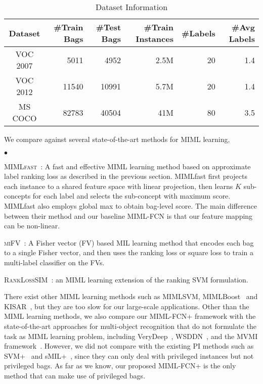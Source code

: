 \documentclass[10pt,twocolumn,letterpaper]{article}
\newcommand{\squishlist}{
	\begin{list}{$\bullet$}
		{ \setlength{\itemsep}{0pt}
			\setlength{\parsep}{1pt}
			\setlength{\topsep}{1pt}
			\setlength{\partopsep}{0pt}
			\setlength{\leftmargin}{1.5em}
			\setlength{\labelwidth}{1em}
			\setlength{\labelsep}{0.5em} } }
\newcommand{\squishend}{
	\end{list}  }
\begin{document}
\begin{table*}
	\centering
	\caption{Dataset Information} \label{datasets}
	\begin{tabular}{c | r r r r r }
		\hline
		Dataset &\#Train Bags &\#Test Bags &\#Train Instances &\#Labels &\#Avg Labels \\ \hline
		\textsc{VOC 2007} &5011 &4952 &2.5M &20 &1.4\\
		\textsc{VOC 2012} &11540 &10991 &5.7M &20 &1.4\\
		\textsc{MS COCO} &82783 &40504 &41M &80 &3.5\\
	\end{tabular}
\end{table*}

We compare against several state-of-the-art methods for MIML
learning, \squishlist \item \textsc{MIMLfast}~\cite{Huang2014}: A
fast and effective MIML learning method based on approximate label
ranking loss as described in the previous section. MIMLfast first
projects each instance to a shared feature space with linear
projection, then learns $K$ sub-concepts for each label and
selects the sub-concept with maximum score. MIMLfast also employs
global max to obtain bag-level score. The main difference between
their method and our baseline MIML-FCN is that our feature mapping
can be non-linear. \item \textsc{miFV}~\cite{Wu2014}: A Fisher
vector (FV) based MIL learning method that encodes each bag to a
single Fisher vector, and then uses the ranking loss or square
loss to train a multi-label classifier on the FVs. \item 
\textsc{RankLossSIM}~\cite{Briggs2012}: an MIML learning extension
of the ranking SVM formulation. \squishend

There exist other MIML learning methods such as MIMLSVM,
MIMLBoost~\cite{Zhou2006} and KISAR~\cite{Li2012}, but they are
too slow for our large-scale applications. Other than the MIML
learning methods, we also compare our \textsc{MIML-FCN+} framework
with the state-of-the-art approaches for multi-object recognition
that do not formulate the task as MIML learning problem, including
VeryDeep~\cite{Simonyan2014}, WSDDN~\cite{Bilen2016}, and the MVMI
framework~\cite{Yang2016a}. However, we did not compare with the
existing PI methods such as SVM+~\cite{Vapnik2009} and
sMIL+~\cite{Li2014}, since they can only deal with privileged
instances but not privileged bags. As far as we know, our proposed
\textsc{MIML-FCN+} is the only method that can make use of
privileged bags.
\end{document}
